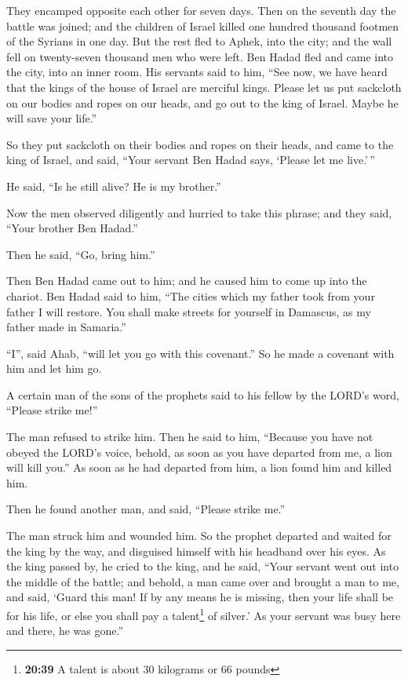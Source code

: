  They encamped opposite each other for seven days. Then
on the seventh day the battle was joined; and the children of Israel
killed one hundred thousand footmen of the Syrians in one day.
 But the rest fled to Aphek, into the city; and the wall
fell on twenty-seven thousand men who were left. Ben Hadad fled and came
into the city, into an inner room.  His servants said to
him, ``See now, we have heard that the kings of the house of Israel are
merciful kings. Please let us put sackcloth on our bodies and ropes on
our heads, and go out to the king of Israel. Maybe he will save your
life.''

 So they put sackcloth on their bodies and ropes on their
heads, and came to the king of Israel, and said, ``Your servant Ben
Hadad says, `Please let me live.'\,''

He said, ``Is he still alive? He is my brother.''

 Now the men observed diligently and hurried to take this
phrase; and they said, ``Your brother Ben Hadad.''

Then he said, ``Go, bring him.''

Then Ben Hadad came out to him; and he caused him to come up into the
chariot.  Ben Hadad said to him, ``The cities which my
father took from your father I will restore. You shall make streets for
yourself in Damascus, as my father made in Samaria.''

``I'', said Ahab, ``will let you go with this covenant.'' So he made a
covenant with him and let him go.

 A certain man of the sons of the prophets said to his
fellow by the LORD's word, ``Please strike me!''

The man refused to strike him.  Then he said to him,
``Because you have not obeyed the LORD's voice, behold, as soon as you
have departed from me, a lion will kill you.'' As soon as he had
departed from him, a lion found him and killed him.

 Then he found another man, and said, ``Please strike
me.''

The man struck him and wounded him.  So the prophet
departed and waited for the king by the way, and disguised himself with
his headband over his eyes.  As the king passed by, he
cried to the king, and he said, ``Your servant went out into the middle
of the battle; and behold, a man came over and brought a man to me, and
said, `Guard this man! If by any means he is missing, then your life
shall be for his life, or else you shall pay a talent\footnote{\textbf{20:39}
  A talent is about 30 kilograms or 66 pounds} of silver.'
 As your servant was busy here and there, he was gone.''


